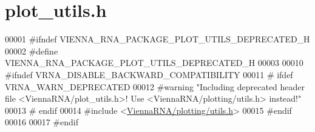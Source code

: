 \hypertarget{plot__utils_8h_source}{}\section{plot\+\_\+utils.\+h}
\label{plot__utils_8h_source}

\begin{DoxyCode}
00001 \textcolor{preprocessor}{#ifndef VIENNA\_RNA\_PACKAGE\_PLOT\_UTILS\_DEPRECATED\_H}
00002 \textcolor{preprocessor}{#define VIENNA\_RNA\_PACKAGE\_PLOT\_UTILS\_DEPRECATED\_H}
00003 
00010 \textcolor{preprocessor}{#ifndef VRNA\_DISABLE\_BACKWARD\_COMPATIBILITY}
00011 \textcolor{preprocessor}{# ifdef VRNA\_WARN\_DEPRECATED}
00012 \textcolor{preprocessor}{#warning "Including deprecated header file <ViennaRNA/plot\_utils.h>! Use <ViennaRNA/plotting/utils.h>
       instead!"}
00013 \textcolor{preprocessor}{# endif}
00014 \textcolor{preprocessor}{#include <\hyperlink{plotting_2utils_8h}{ViennaRNA/plotting/utils.h}>}
00015 \textcolor{preprocessor}{#endif}
00016 
00017 \textcolor{preprocessor}{#endif}
\end{DoxyCode}
